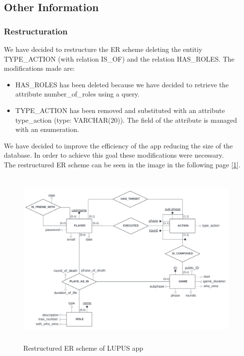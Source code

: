 \subsection{Other Information}


\subsubsection{Restructuration}
We have decided to restructure the ER scheme deleting the entitiy TYPE\_ACTION (with relation IS\_OF) and the relation HAS\_ROLES. The modifications made are: \\
\begin{itemize}
    \item HAS\_ROLES has been deleted because we have decided to retrieve the attribute number\_of\_roles using a query.\\
    \item TYPE\_ACTION has been removed and substituted with an attribute type\_action (type: VARCHAR(20)). The field of the attribute is managed with an enumeration.
\end{itemize}
We have decided to improve the efficiency of the app reducing the size of the database. In order to achieve this goal these modifications were necessary.\\
The restructured ER scheme can be seen in the image in the following page [\ref{fig:res_er_scheme}].


\begin{figure}[htbp] 
    \centering
    \includegraphics[height=9cm]{images/scheme/er_restructured_f.jpeg}
    \caption{Restructured ER scheme of LUPUS app}
    \label{fig:res_er_scheme}
\end{figure}



